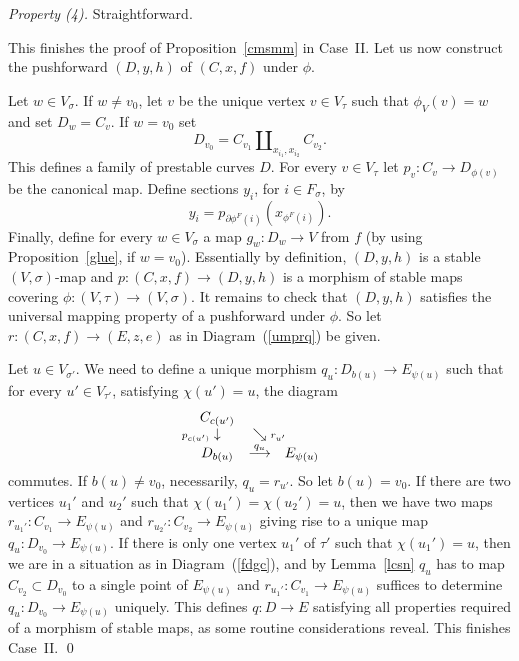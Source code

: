 \documentclass[11pt]{amsart}
\theoremstyle{definition}
\theoremstyle{remark}
\newcommand{\del}{\partial}
\newcommand{\ldiag}[1]
       {\makebox[0cm]{\({\scriptstyle#1}\downarrow\phantom{\scriptstyle#1}\)}}
\newcommand{\sediagr}[1]
       {\makebox[0cm]{\(\phantom{\scriptstyle#1}\searrow{\scriptstyle#1}\)}}
\renewcommand{\t}{_{\tau}}
\newcommand{\s}{_{\sigma}}
\theoremstyle{plain}
\theoremstyle{definition}
\theoremstyle{remark}
\begin{document}
{\em Property (4). } Straightforward.

This finishes the proof of Proposition~\ref{cmsmm} in Case~II\@. Let us now
construct the pushforward \((D,y,h)\) of
\((C,x,f)\) under \(\phi\).

Let \(w\in V\s\). If \(w\not=v_0\), let \(v\) be the unique vertex \(v\in V\t\) such
that \(\phi_V(v)=w\) and set \(D_w=C_v\). If
\(w=v_0\) set
\[
D_{v_0}=C_{v_1}\amalg_{x_{i_1},x_{i_2}}C_{v_2}.
\]
This defines a family of prestable curves \(D\). For every \(v\in V\t\) let
\(p_v:C_v\rightarrow D_{\phi(v)}\) be the canonical
map. Define sections \(y_i\), for \(i\in F\s\), by
\[
y_i=p_{\del\phi^F(i)}(x_{\phi^F(i)}).
\]
Finally, define for every \(w\in V\s\) a map \(g_w:D_w\rightarrow V\) from \(f\) (by
using Proposition~\ref{glue}, if
\(w=v_0\)). Essentially by definition, \((D,y,h)\) is a stable \((V,\sigma)\)-map and
\(p:(C,x,f)\rightarrow(D,y,h)\) is a
morphism of stable maps covering \(\phi:(V,\tau)\rightarrow(V,\sigma)\). It
remains to check that \((D,y,h)\) satisfies the
universal mapping property of a pushforward under \(\phi\). So let
\(r:(C,x,f)\rightarrow(E,z,e)\) as in
Diagram~(\ref{umprq}) be given.

Let \(u\in V_{\sigma'}\). We need to define a unique morphism
\(q_u:D_{b(u)}\rightarrow E_{\psi(u)}\) such that for every
\(u'\in V_{\tau'}\), satisfying \(\chi(u')=u\), the diagram
\[
\begin{array}{ccc}
C_{c(u')} & & \\
\ldiag{p_{c(u')}} & \sediagr{r_{u'}} & \\
D_{b(u)} & \stackrel{q_u}{\longrightarrow} & E_{\psi(u)}
\end{array}
\]
commutes. If \(b(u)\not=v_0\), necessarily, \(q_u=r_{u'}\). So let \(b(u)=v_0\). If
there are two vertices \(u_1'\) and \(u_2'\)
such that \(\chi(u_1')=\chi(u_2')=u\), then we have two maps
\(r_{u_1'}:C_{v_1}\rightarrow E_{\psi(u)}\) and
\(r_{u_2'}:C_{v_2}\rightarrow E_{\psi(u)}\) giving rise to a unique map
\(q_u:D_{v_0}\rightarrow E_{\psi(u)}\). If there is
only one vertex \(u_1'\) of \(\tau'\) such that \(\chi(u_1')=u\), then we are in a
situation as in Diagram~(\ref{fdgc}), and
by Lemma~\ref{lcsn} \(q_u\) has to map \(C_{v_2}\subset D_{v_0}\) to a single point
of \(E_{\psi(u)}\) and
\(r_{u_1'}:C_{v_1}\rightarrow E_{\psi(u)}\) suffices to determine
\(q_u:D_{v_0}\rightarrow E_{\psi(u)}\) uniquely. This
defines \(q:D\rightarrow E\) satisfying all properties required of a morphism of
stable maps, as some routine
considerations reveal. This finishes Case~II\@. \qed
\end{document}
